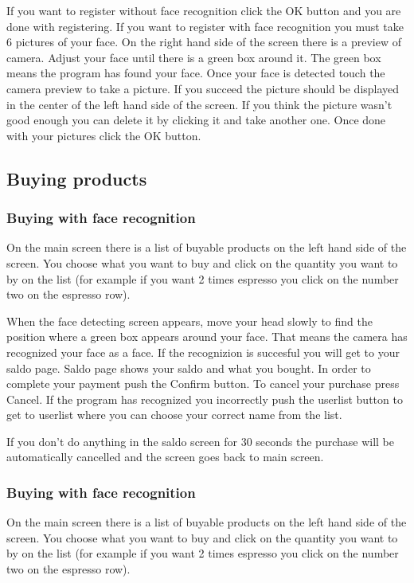 \documentclass[11pt]{article}
\begin{document}
If you want to register without face recognition click the OK button and you are done with registering. If you want to register with face recognition you must take 6 pictures of your face. On the right hand side of the screen there is a preview of camera. Adjust your face until there is a green box around it. The green box means the program has found your face. Once your face is detected touch the camera preview to take a picture. If you succeed the picture should be displayed in the center of the left hand side of the screen. If you think the picture wasn’t good enough you can delete it by clicking it and take another one. Once done with your pictures click the OK button.

\subsection{Buying products}

\subsubsection*{Buying with face recognition}
On the main screen there is a list of buyable products on the left hand side of the screen. You choose what you want to buy and click on the quantity you want to by on the list (for example if you want 2 times espresso you click on the number two on the espresso row).

When the face detecting screen appears, move your head slowly to find the position where a green box appears around your face. That means the camera has recognized your face as a face. If the recognizion is succesful you will get to your saldo page. Saldo page shows your saldo and what you bought. In order to complete your payment push the Confirm button. To cancel your purchase press Cancel. If the program has recognized you incorrectly push the userlist button to get to userlist where you can choose your correct name from the list.

If you don’t do anything in the saldo screen for 30 seconds the purchase will be automatically cancelled and the screen goes back to main screen.

\subsubsection*{Buying with face recognition}
On the main screen there is a list of buyable products on the left hand side of the screen. You choose what you want to buy and click on the quantity you want to by on the list (for example if you want 2 times espresso you click on the number two on the espresso row).
\end{document}
